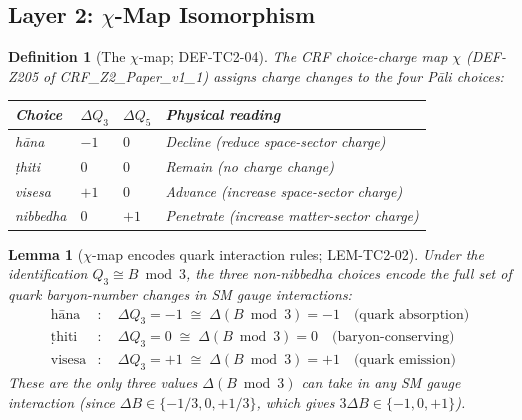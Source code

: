 \documentclass[12pt, a4paper]{article}
\newtheorem{lemma}{Lemma}[section]
\newtheorem{definition}{Definition}[section]
\begin{document}
\subsection{Layer 2: \texorpdfstring{$\chi$}{chi}-Map Isomorphism}
\label{sec:layer2}

\begin{definition}[The $\chi$-map; DEF-TC2-04]
\label{def:chi-map}
The CRF choice-charge map $\chi$ (DEF-Z205 of CRF\_Z2\_Paper\_v1\_1)
assigns charge changes to the four Pāli choices:
\begin{center}
{\small
\renewcommand{\arraystretch}{1.25}
\begin{tabular}{p{2.2cm} p{1.6cm} p{1.6cm} p{4.5cm}}
\toprule
\textbf{Choice} & $\Delta Q_3$ & $\Delta Q_5$ & \textbf{Physical reading} \\
\midrule
hāna     & $-1$ & $0$ & Decline (reduce space-sector charge) \\
ṭhiti    & $0$  & $0$ & Remain (no charge change) \\
visesa   & $+1$ & $0$ & Advance (increase space-sector charge) \\
nibbedha & $0$  & $+1$ & Penetrate (increase matter-sector charge) \\
\bottomrule
\end{tabular}
}
\end{center}
\end{definition}

\begin{lemma}[$\chi$-map encodes quark interaction rules; LEM-TC2-02]
\label{lem:chi-quark}
Under the identification $Q_3 \cong B \bmod 3$, the three
non-nibbedha choices encode the full set of quark baryon-number
changes in SM gauge interactions:
\begin{align}
  \text{hāna} &:\quad \Delta Q_3 = -1 \;\cong\; \Delta(B\bmod 3) = -1
  \quad\text{(quark absorption)} \label{eq:hana} \\
  \text{ṭhiti} &:\quad \Delta Q_3 = 0 \;\cong\; \Delta(B\bmod 3) = 0
  \quad\text{(baryon-conserving)} \label{eq:thiti} \\
  \text{visesa} &:\quad \Delta Q_3 = +1 \;\cong\; \Delta(B\bmod 3) = +1
  \quad\text{(quark emission)} \label{eq:visesa}
\end{align}
These are the only three values $\Delta(B\bmod 3)$ can take in any
SM gauge interaction (since $\Delta B \in \{-1/3, 0, +1/3\}$, which
gives $3\Delta B \in \{-1, 0, +1\}$).
\end{lemma}
\end{document}
